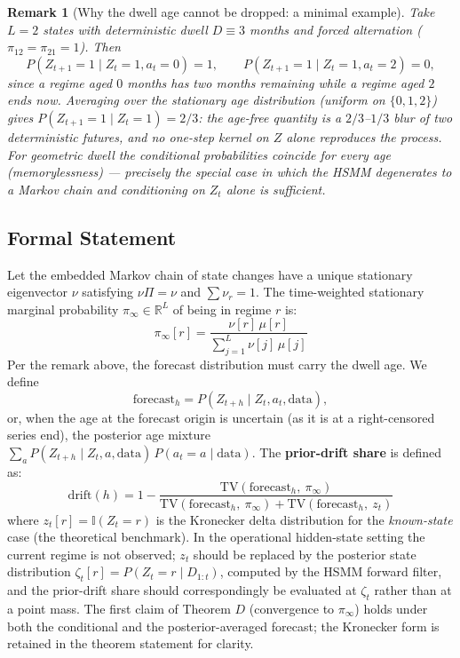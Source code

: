 \documentclass[11pt,a4paper]{article}
\newtheorem{remark}{Remark}
\begin{document}
\begin{remark}[Why the dwell age cannot be dropped: a minimal example]
Take $L = 2$ states with deterministic dwell $D \equiv 3$ months and forced alternation ($\pi_{12} = \pi_{21} = 1$). Then %
\[
P(Z_{t+1} = 1 \mid Z_t = 1, a_t = 0) = 1, \qquad P(Z_{t+1} = 1 \mid Z_t = 1, a_t = 2) = 0, %
\]
since a regime aged $0$ months has two months remaining while a regime aged $2$ ends now. Averaging over the stationary age distribution (uniform on $\{0, 1, 2\}$) gives $P(Z_{t+1} = 1 \mid Z_t = 1) = 2/3$: the age-free quantity is a $2/3$--$1/3$ blur of two \emph{deterministic} futures, and no one-step kernel on $Z$ alone reproduces the process. For geometric dwell the conditional probabilities coincide for every age (memorylessness) --- precisely the special case in which the HSMM degenerates to a Markov chain and conditioning on $Z_t$ alone is sufficient. %
\end{remark}

\subsection{Formal Statement}
Let the embedded Markov chain of state changes have a unique stationary eigenvector $\nu$ satisfying $\nu \Pi = \nu$ and $\sum \nu_r = 1$. The time-weighted stationary marginal probability $\pi_\infty \in \mathbb{R}^L$ of being in regime $r$ is:
\begin{equation}\label{eq:stationary_marginal}
\pi_\infty[r] = \frac{\nu[r]\,\mu[r]}{\sum_{j=1}^{L} \nu[j]\,\mu[j]}
\end{equation}
Per the remark above, the forecast distribution must carry the dwell age. We define %
\[
\text{forecast}_h = P(Z_{t+h} \mid Z_t, a_t, \text{data}), %
\]
or, when the age at the forecast origin is uncertain (as it is at a right-censored series end), the posterior age mixture $\sum_{a} P(Z_{t+h} \mid Z_t, a, \text{data})\, P(a_t = a \mid \text{data})$. The \textbf{prior-drift share} is defined as: %
\begin{equation}\label{eq:prior_drift}
\text{drift}(h) = 1 - \frac{\text{TV}(\text{forecast}_h,\ \pi_\infty)}{\text{TV}(\text{forecast}_h,\ \pi_\infty) + \text{TV}(\text{forecast}_h,\ z_t)}
\end{equation}
where $z_t[r] = \mathbb{I}(Z_t = r)$ is the Kronecker delta distribution for the \emph{known-state} case (the theoretical benchmark). In the operational hidden-state setting the current regime is not observed; $z_t$ should be replaced by the posterior state distribution $\zeta_t[r] = P(Z_t = r \mid D_{1:t})$, computed by the HSMM forward filter, and the prior-drift share should correspondingly be evaluated at $\zeta_t$ rather than at a point mass. The first claim of Theorem $D$ (convergence to $\pi_\infty$) holds under both the conditional and the posterior-averaged forecast; the Kronecker form is retained in the theorem statement for clarity. %
\end{document}
